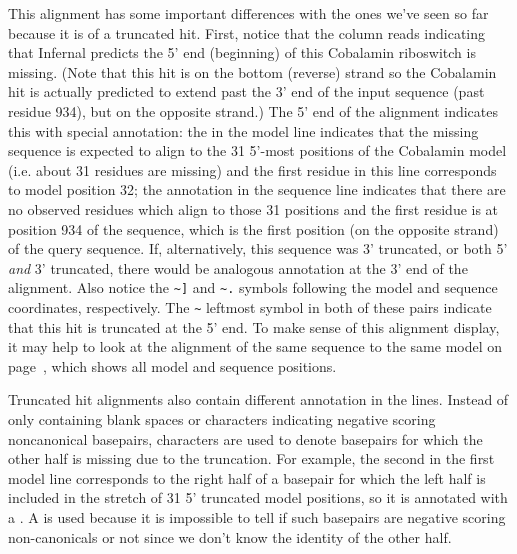 This alignment has some important differences with the ones we've seen
so far because it is of a truncated hit. First, notice that the
 column reads  indicating that Infernal
predicts the 5' end (beginning) of this Cobalamin riboswitch is
missing. (Note that this hit is on the bottom (reverse) strand so the
Cobalamin hit is actually predicted to extend past the 3' end of the
input sequence (past residue 934), but on the opposite strand.) The 5'
end of the alignment indicates this with special annotation: the
\otext{<[31]*} in the model line indicates that the missing sequence
is expected to align to the 31 5'-most positions of the Cobalamin
model (i.e. about 31 residues are missing) and the first 
residue in this line corresponds to model position 32; the
\otext{<[0]*} annotation in the sequence line indicates that there are
no observed residues which align to those 31 positions and the first
 residue is at position 934 of the sequence, which is the
first position (on the opposite strand) of the query sequence. If,
alternatively, this sequence was 3' truncated, or both 5' \emph{and}
3' truncated, there would be analogous annotation at the 3' end of the
alignment. Also notice the \verb+~]+ and \verb+~.+ symbols following
the model and sequence coordinates, respectively. The \verb+~+
leftmost symbol in both of these pairs indicate that this hit is
truncated at the 5' end. To make sense of this alignment display, it
may help to look at the  alignment of the same sequence
to the same model on page~\pageref{cmalign-cobalamin}, which shows all
model and sequence positions.

Truncated hit alignments also contain different annotation in the
 lines. Instead of only containing blank spaces or 
characters indicating negative scoring noncanonical basepairs,
 characters are used to denote basepairs for which the other
half is missing due to the truncation. For example, the second
 in the first model line corresponds to the right half of a
basepair for which the left half is included in the stretch of 31 5'
truncated model positions, so it is annotated with a .  A
 is used because it is impossible to tell if such basepairs
are negative scoring non-canonicals or not since we don't know the
identity of the other half.

